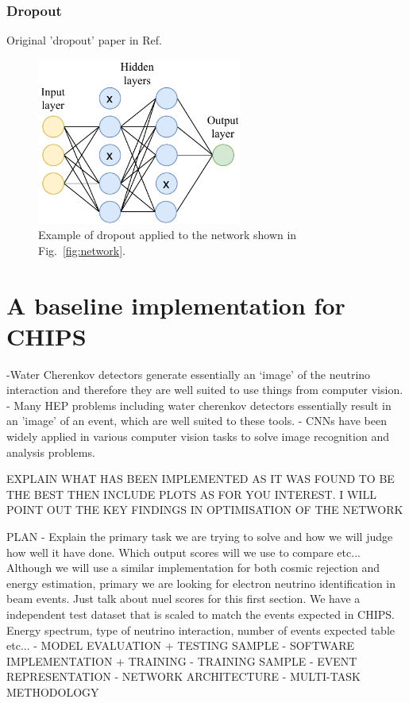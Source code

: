 \subsubsection*{Dropout}

Original 'dropout' paper in Ref.~\cite{hinton2012}
\begin{figure} %
    \includegraphics[width=0.6\textwidth]{diagrams/6-cvn/dropout.pdf}
    \caption[dropout short]
    {Example of dropout applied to the network shown in Fig.~\ref{fig:network}.}
    \label{fig:dropout}
\end{figure}

\section{A baseline implementation for CHIPS} %
\label{sec:cvn_baseline} %

-Water Cherenkov detectors generate essentially an `image' of the neutrino interaction and
therefore they are well suited to use things from computer vision.
- Many HEP problems including water cherenkov detectors essentially result in an 'image' of an
event, which are well suited to these tools.
- CNNs have been widely applied in various computer vision tasks to solve image recognition and
analysis problems.

EXPLAIN WHAT HAS BEEN IMPLEMENTED AS IT WAS FOUND TO BE THE BEST THEN INCLUDE PLOTS AS FOR YOU
INTEREST.
I WILL POINT OUT THE KEY FINDINGS IN OPTIMISATION OF THE NETWORK

PLAN
- Explain the primary task we are trying to solve and how we will judge how well it have done.
Which output scores will we use to compare etc... Although we will use a similar implementation
for both cosmic rejection and energy estimation, primary we are looking for electron neutrino
identification in beam events. Just talk about nuel scores for this first section. We have a
independent test dataset that is scaled to match the events expected in CHIPS. Energy spectrum,
type of neutrino interaction, number of events expected table etc...
- MODEL EVALUATION + TESTING SAMPLE
- SOFTWARE IMPLEMENTATION + TRAINING
- TRAINING SAMPLE
- EVENT REPRESENTATION
- NETWORK ARCHITECTURE
- MULTI-TASK METHODOLOGY

